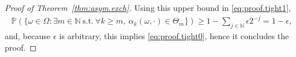 \documentclass{article}
\theoremstyle{definition}
\renewcommand{\&}{and}
\begin{document}
\begin{proof}[Proof of Theorem~\ref{thm:asym.exch}]
Using this upper bound in \eqref{eq:proof.tight1},
\begin{align*}
    \mathbb{P}\left(\{\omega \in \Omega : \exists m \in \mathbb{N} \ \text{s.t.} \ \forall k\geq m, \ \alpha_{k}(\omega, \cdot) \in \Theta_{m} \} \right)    \geq 1- \sum_{j\in \mathbb{N}} \epsilon 2^{-j} = 1 - \epsilon,
\end{align*}
and, because $\epsilon$ is arbitrary, this implies \eqref{eq:proof.tight0}, hence it concludes the proof.
\end{proof} \vspace{0.4cm}
\end{document}
